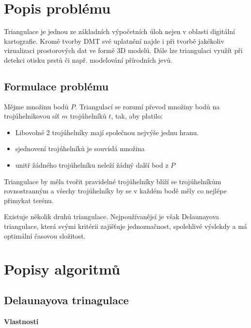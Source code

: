 \documentclass[11pt]{article}
\begin{document}
\section{Popis problému}
Triangulace je jednou ze základních výpočetních úloh nejen v oblasti digitální kartografie. Kromě tvorby DMT své uplatnění najde i při tvorbě jakékoliv vizualizaci prostorových dat ve formě 3D modelů. Dále lze triangulaci využít při detekci otisku prstů či např. modelování přírodních jevů.
 
\subsection{Formulace problému}

Mějme množinu bodů $P$. Triangulací se rozumí převod množiny bodů na trojúhelnikovou síť $m$ trojúhelníků $t$, tak, aby platilo:

\begin{itemize}
	\item Libovolné 2 trojúhelníky mají společnou nejvýše jednu hranu.
	\item sjednovení trojúhelníků je souvislá množina
	\item unitř žádného trojúhelníku neleží žádný další bod z $P$
	
\end{itemize}


Triangulace by měla tvořit pravidelné trojúhelníky blíží se trojúhelníkům rovnostranným a všechy trojúhelníky by se v každém bodě měly co nejlépe přimykat terénu. 

Existuje několik druhů triangulace. Nejpoužívanějsí je však Delaunayova triangulace, která svými kritérii zajišťuje jednoznačnost, spolehlivé výslekdy a má optimální časovou složitost.


\section{Popisy algoritmů}
\subsection{Delaunayova trinagulace}

\paragraph{Vlastnosti}
\end{document}
